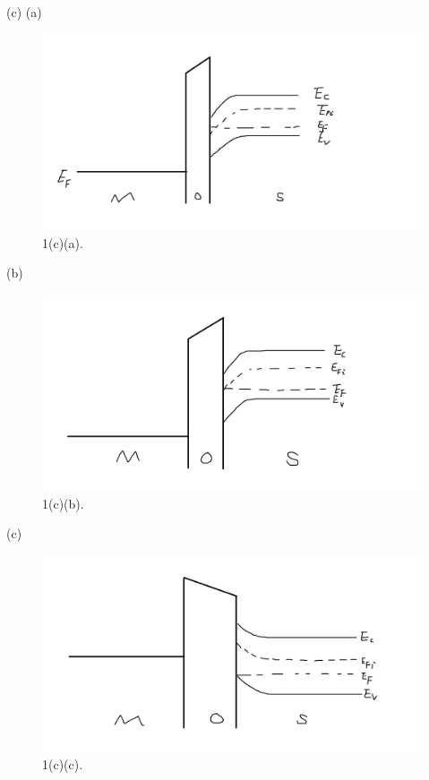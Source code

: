 \documentclass[a4paper]{article}
\begin{document}
(c) (a)
\begin{figure}[H]
    \centering
    \includegraphics[width=1\textwidth]{1.png}
    \caption{1(c)(a).}
\end{figure}
(b)
\begin{figure}[H]
    \centering
    \includegraphics[width=1\textwidth]{2.png}
    \caption{1(c)(b).}
\end{figure}
(c)
\begin{figure}[H]
    \centering
    \includegraphics[width=1\textwidth]{3.png}
    \caption{1(c)(c).}
\end{figure}
\end{document}

